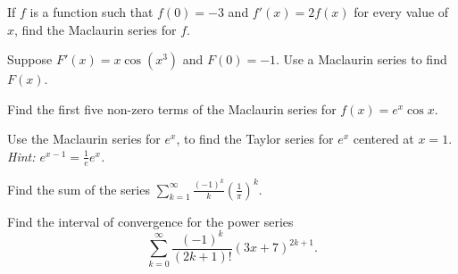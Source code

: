 \documentclass[12pt, addpoints]{exam/exam}
\newcommand{\1}{^{-1}}
\theoremstyle{plain}
\begin{document}
\begin{questions}
\thispagestyle{headandfoot}

\question[] %
 If $f$ is a function such that $f(0)=-3$ and $f'(x)=2f(x)$ for every value of $x$, find the Maclaurin series for $f$.


\question[] %
Suppose $F'(x)=x\cos(x^3)$ and $F(0)=-1$.  Use a Maclaurin series to find $F(x)$.

\question[] %
 Find the first five non-zero terms of the Maclaurin series for $f(x)=e^x\cos x$.
	
\question[] %
Use the Maclaurin series for $e^x$, to find the Taylor series for $e^x$ centered at $x=1$.  \textit{Hint: $\textstyle e^{x-1}=\frac{1}{e}e^x$.}

\question[] %
 Find the sum of the series $\sum_{k=1}^{\infty}\frac{(-1)^k}{k}\left(\frac{1}{\pi}\right)^k$.

\question[]%
Find the interval of convergence for the power series 
\[
\sum_{k=0}^{\infty}\frac{(-1)^k}{(2k+1)!}(3x+7)^{2k+1}.
\]

\end{questions}
\end{document}
